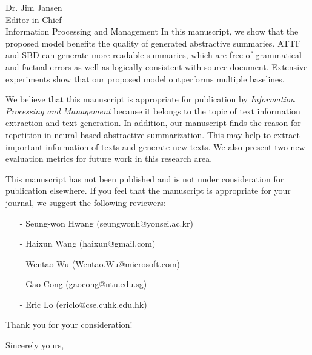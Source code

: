 \documentclass[11pt]{letter} %
\begin{document}
\begin{letter}{Dr. Jim Jansen \\
Editor-in-Chief  \\
Information Processing and Management}
In this manuscript, we show that the proposed model benefits the quality of generated abstractive summaries.
ATTF and SBD can generate more readable summaries, which are free of grammatical and factual errors
as well as logically consistent with source document.
Extensive experiments show that our proposed model outperforms multiple baselines.
 
We believe that this manuscript is appropriate for publication by
\textit{Information Processing and Management}
because it belongs to the topic of text information extraction and text generation. 
In addition, our manuscript finds the reason for repetition in neural-based abstractive summarization.
This may help to extract important information of texts and generate new texts.
We also present two new evaluation metrics for future work in this research area.

This manuscript has not been published and is not under
consideration for publication elsewhere. 
If you feel that the manuscript is appropriate for your journal, 
we suggest the following reviewers: 
\begin{enumerate}
	\item[-] Seung-won Hwang (seungwonh@yonsei.ac.kr)
	\item[-] Haixun Wang (haixun@gmail.com)
	\item[-] Wentao Wu (Wentao.Wu@microsoft.com)
	\item[-] Gao Cong (gaocong@ntu.edu.sg)
	\item[-] Eric Lo (ericlo@cse.cuhk.edu.hk)
\end{enumerate}
Thank you for your consideration!

\closing{Sincerely yours,}




\end{letter}
\end{document}
